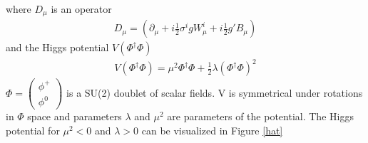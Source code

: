 where $D_\mu$ is an operator 
 \begin{align}
D_\mu = \left(\partial_\mu+i\frac{1}{2}\sigma^igW^i_\mu+i\frac{1}{2} g' B_\mu \right) 
 \end{align}
 and the Higgs potential $V(\Phi^\dagger \Phi)$
\begin{align}
 V(\Phi^\dagger \Phi)=\mu^2 \Phi^\dagger \Phi +\frac{1}{2} \lambda (\Phi^\dagger \Phi)^2   
\end{align}
 $\Phi=\left(\begin{array}{c}
 \phi^+ \\
\phi^0
\end{array} \right) $ is a SU(2) doublet of scalar fields. V is symmetrical under rotations in $\Phi$ space
and parameters $\lambda $ and $\mu^2$ are parameters of the potential. The Higgs potential for $\mu^2 <0$ and $\lambda>0$ can be visualized in Figure \ref{hat}

